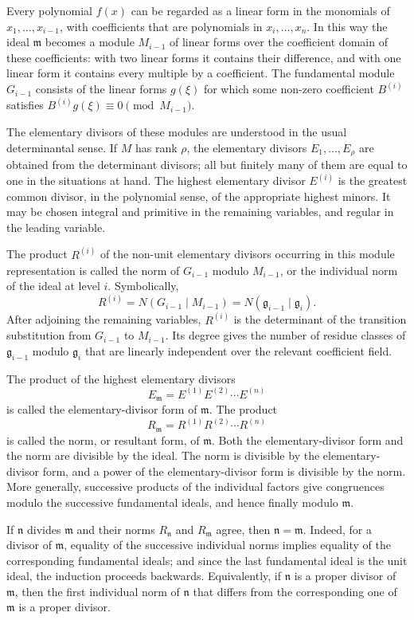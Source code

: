 \documentclass[12pt]{article}
\begin{document}
Every polynomial $f(x)$ can be regarded as a linear form in the monomials of $x_1,\ldots,x_{i-1}$, with coefficients that are polynomials in $x_i,\ldots,x_n$. In this way the ideal $\mathfrak m$ becomes a module $M_{i-1}$ of linear forms over the coefficient domain of these coefficients: with two linear forms it contains their difference, and with one linear form it contains every multiple by a coefficient. The fundamental module $G_{i-1}$ consists of the linear forms $g(\xi)$ for which some non-zero coefficient $B^{(i)}$ satisfies $B^{(i)}g(\xi)\equiv0\pmod{M_{i-1}}$.

The elementary divisors of these modules are understood in the usual determinantal sense. If $M$ has rank $\rho$, the elementary divisors $E_1,\ldots,E_\rho$ are obtained from the determinant divisors; all but finitely many of them are equal to one in the situations at hand. The highest elementary divisor $E^{(i)}$ is the greatest common divisor, in the polynomial sense, of the appropriate highest minors. It may be chosen integral and primitive in the remaining variables, and regular in the leading variable.

The product $R^{(i)}$ of the non-unit elementary divisors occurring in this module representation is called the norm of $G_{i-1}$ modulo $M_{i-1}$, or the individual norm of the ideal at level $i$. Symbolically,
\[
  R^{(i)}=N(G_{i-1}\mid M_{i-1})=N(\mathfrak g_{i-1}\mid \mathfrak g_i).
\]
After adjoining the remaining variables, $R^{(i)}$ is the determinant of the transition substitution from $G_{i-1}$ to $M_{i-1}$. Its degree gives the number of residue classes of $\mathfrak g_{i-1}$ modulo $\mathfrak g_i$ that are linearly independent over the relevant coefficient field.

The product of the highest elementary divisors
\[
  E_{\mathfrak m}=E^{(1)}E^{(2)}\cdots E^{(n)}
\]
is called the elementary-divisor form of $\mathfrak m$. The product
\[
  R_{\mathfrak m}=R^{(1)}R^{(2)}\cdots R^{(n)}
\]
is called the norm, or resultant form, of $\mathfrak m$. Both the elementary-divisor form and the norm are divisible by the ideal. The norm is divisible by the elementary-divisor form, and a power of the elementary-divisor form is divisible by the norm. More generally, successive products of the individual factors give congruences modulo the successive fundamental ideals, and hence finally modulo $\mathfrak m$.

If $\mathfrak n$ divides $\mathfrak m$ and their norms $R_{\mathfrak n}$ and $R_{\mathfrak m}$ agree, then $\mathfrak n=\mathfrak m$. Indeed, for a divisor of $\mathfrak m$, equality of the successive individual norms implies equality of the corresponding fundamental ideals; and since the last fundamental ideal is the unit ideal, the induction proceeds backwards. Equivalently, if $\mathfrak n$ is a proper divisor of $\mathfrak m$, then the first individual norm of $\mathfrak n$ that differs from the corresponding one of $\mathfrak m$ is a proper divisor.
\end{document}
